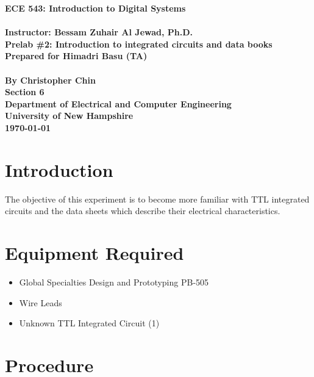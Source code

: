\documentclass[11pt,a4paper]{article}
\begin{document}
\begin{center}
\textbf{
    \Large{ECE 543: Introduction to Digital Systems}
    \\~\\
    \large{Instructor: Bessam Zuhair Al Jewad, Ph.D.}
    \\[1.25in]
    \LARGE{Prelab \#2: Introduction to integrated circuits and data books}
    \\[0.62in]
    \large{Prepared for Himadri Basu (TA)\\~\\By Christopher Chin}
    \\[1.25in]
    \LARGE{Section 6}
    \\[1.25in]
    \Large{Department of Electrical and Computer Engineering\\
           University of New Hampshire}
    \\[1.25in]
    \Large{\today}
}
\end{center}
\clearpage
{}

\tableofcontents
\pagebreak

\section{Introduction}
The objective of this experiment is to become more familiar with TTL integrated
circuits and the data sheets which describe their electrical characteristics.
\section{Equipment Required}
\begin{itemize}
    \item Global Specialties Design and Prototyping PB-505
    \item Wire Leads
    \item Unknown TTL Integrated Circuit (1)
\end{itemize}
\section{Procedure}
\end{document}
